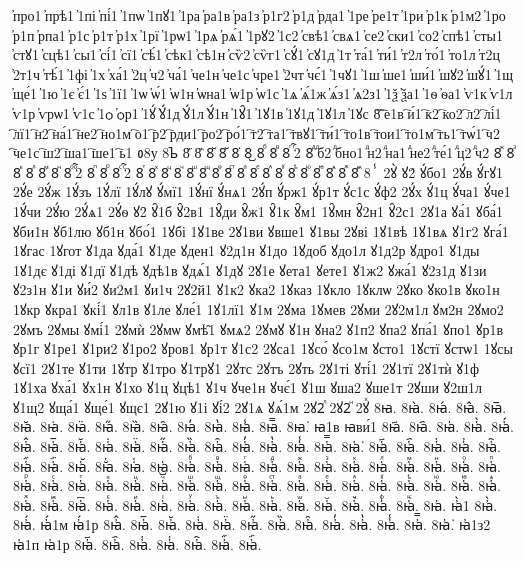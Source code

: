{҆про1
҆прѣ1
҆1пі
҆пі́1
҆1пѡ
҆1пꙋ1
҆1ра
҆ра1в
҆ра1з
҆р1г2
҆р1д
҆рда1
҆1ре
҆ре1т
҆1ри
҆р1к
҆р1м2
҆1ро
҆р1п
҆рпа1
҆р1с
҆р1т
҆р1х
҆1рї
҆1рѡ1
҆1рѧ
҆рѧ́1
҆1рꙋ2
҆1с2
҆свѣ1
҆свѧ1
҆се2
҆ски1
҆со2
҆спѣ1
҆сты1
҆стꙋ1
҆сцѣ1
҆сы1
҆сі́1
҆сї1
҆сѣ́1
҆сѣк1
҆сѣ1н
҆сѷ2
҆сѷг1
҆сꙋ́1
҆сꙋ1д
҆1т
҆та́1
҆ти́1
҆т2л
҆то́1
҆то1л
҆т2ц
҆2т1ч
҆тѣ́1
҆1фі
҆1х
҆ха́1
҆2ц
҆ч2
҆ча́1
҆че1н
҆че1с
҆чре1
҆2чт
҆чє́1
҆1чꙋ1
҆1ш
҆ше1
҆ши́1
҆шꙋ2
҆шꙋ́1
҆1щ
҆ще́1
҆1ю
҆1є
҆є́1
҆1ѕ
҆1ї1
҆1ѡ
҆ѡ́1
҆ѡ1н
҆ѡна1
҆ѡ1р
҆ѡ1с
҆1ѧ
҆ѧ́1ж
҆ѧ́з1
҆ѧ2з1
҆1ѯ
҆ѯа1
҆1ѳ
҆ѳа1
҆ѵ1к
҆ѵ1л
҆ѵ1р
҆ѵрѡ1
҆ѵ1с
҆1ѻ
҆ѻр1
҆1ꙋ́
҆ꙋ́1д
҆ꙋ́1л
҆ꙋ́1н
҆1ꙋ̑1
҆1ꙋ1в
҆1ꙋ1д
҆1ꙋ1л
҆1ꙋс
8҇
҇е1в
҇и́1
҇к2
҇ко2
҇л2
҇лі́1
҇лї1
҇н2
҇на́1
҇не2
҇но1м
҇о1
҇р2
҇рди1
҇ро2
҇ро́1
҇т2
҇та1
҇твꙋ1
҇ти́1
҇то1в
҇тои1
҇то1м
҇ть1
҇тѡ́1
҇ч2
҇че1с
҇ш2
҇ша1
҇ше1
҇ь1
ᲂ8у  
8ᲆ
8᷀
8᷁
8᷶
8᷷
8᷸
8᷹
8ⷠ
8ⷡ
8ⷢ
ⷢ҇2
8ⷣ
ⷣб2
ⷣбно1
ⷣн2
ⷣна1
ⷣне2
ⷣте́1
ⷣц2
ⷣч2
8ⷤ
8ⷥ
8ⷦ
8ⷧ
8ⷨ
8ⷩ
8ⷪ
ⷪ҇2
8ⷫ
8ⷬ
8ⷭ
ⷭ҇2
8ⷮ
8ⷯ
8ⷰ
8ⷱ
8ⷲ
8ⷳ
8ⷴ
8ⷵ
8ⷶ
8ⷷ
8ⷸ
8ⷹ
8ⷺ
8ⷻ
8ⷼ
8ⷽ
8ⷾ
8ⷿ
8ⸯ
2ꙋ̀
ꙋ2́
ꙋ́бо1
2ꙋ́в
ꙋ́гꙋ1
2ꙋ́е
2ꙋ́ж
1ꙋ́зъ
1ꙋ́лї
1ꙋ́лꙋ
ꙋ́мї1
1ꙋ́нї
ꙋ́нѧ1
2ꙋ́п
ꙋ́рж1
ꙋ́р1т
ꙋ́с1с
ꙋ́ф2
2ꙋ́х
ꙋ́1ц
ꙋ́ча1
ꙋ́че1
1ꙋ́чи
2ꙋ́ю
2ꙋ́ѧ1
2ꙋ́ѳ
ꙋ2̑
ꙋ̑1б
ꙋ̑2в1
1ꙋ̑ди
ꙋ̑ж1
ꙋ̑1к
ꙋ̑м1
1ꙋ̑мн
ꙋ̑2н1
ꙋ̑2с1
2ꙋ1а
ꙋа́1
ꙋба́1
ꙋби1н
ꙋб1лю
ꙋб1н
ꙋбо́1
1ꙋбі
1ꙋ1ве
2ꙋ1ви
ꙋвше1
ꙋ1вы
2ꙋві
1ꙋ1вѣ
1ꙋ1вѧ
ꙋ1г2
ꙋга́1
1ꙋгас
1ꙋгот
ꙋ1да
ꙋда́1
ꙋ1де
ꙋден1
ꙋ2д1н
ꙋ1до
1ꙋдоб
ꙋдо1л
ꙋ1д2р
ꙋдро1
ꙋ1ды
1ꙋ1дє
ꙋ1ді
ꙋ1дї
ꙋ1дѣ
ꙋдѣ1в
ꙋдѧ́1
ꙋ1дꙋ
2ꙋ1е
ꙋета1
ꙋете1
ꙋ1ж2
ꙋжа́1
ꙋ2з1д
ꙋ1зи
ꙋ2з1н
ꙋ1и
ꙋи́2
ꙋи2м1
ꙋи1ч
2ꙋ2й1
ꙋ1к2
ꙋка2
1ꙋказ
1ꙋкло
1ꙋклѡ
2ꙋко
ꙋко1в
ꙋко1н
1ꙋкр
ꙋкра1
ꙋкі́1
ꙋл1в
ꙋ1ле
ꙋле́1
1ꙋ1лї1
ꙋ1м
2ꙋма
1ꙋмев
2ꙋми
2ꙋ2м1л
ꙋм2н
2ꙋмо2
2ꙋмъ
2ꙋмы
ꙋмі́1
2ꙋмѝ
2ꙋмѡ
ꙋмѣ̑1
ꙋмѧ2
2ꙋмꙋ
ꙋ1н
ꙋна2
ꙋ1п2
ꙋпа2
ꙋпа́1
ꙋпо1
ꙋр1в
ꙋр1г
ꙋ1ре1
ꙋ1ри2
ꙋ1ро2
ꙋров1
ꙋр1т
ꙋ1с2
2ꙋса1
1ꙋсо́
ꙋсо1м
ꙋсто1
1ꙋстї
ꙋстѡ1
1ꙋсы
ꙋсї1
2ꙋ1те
ꙋ1ти
1ꙋтр
ꙋ1тро
ꙋ1трꙋ1
2ꙋтс
2ꙋтъ
2ꙋть
2ꙋ1ті
ꙋті́1
2ꙋ1тї
2ꙋ1тѝ
ꙋ1ф
1ꙋ1ха
ꙋха́1
ꙋх1н
ꙋ1хо
ꙋ1ц
ꙋцѣ1
ꙋ1ч
ꙋче1н
ꙋчє́1
ꙋ1ш
ꙋша2
ꙋше1т
2ꙋши
ꙋ2ш1л
ꙋ1щ2
ꙋща́1
ꙋще́1
ꙋщє1
2ꙋ1ю
ꙋ1і
ꙋі́2
2ꙋ1ѧ
ꙋѧ́1м
2ꙋ2ⷧ
2ꙋ2ⷩ
2ꙋⷯ
8ꙗ.
8ꙗ̀.
8ꙗ́.
8ꙗ̂.
8ꙗ̅.
8ꙗ̆.
8ꙗ̇.
8ꙗ̈.
8ꙗ̋.
8ꙗ̏.
8ꙗ̑.
8ꙗ̓.
8ꙗ̔.
8ꙗ̾.
8ꙗ̿.
8ꙗ͘.
ꙗ1в
ꙗви́1
8ꙗ҃.
8ꙗ҄.
8ꙗ҅.
8ꙗ҅̀.
8ꙗ҅́.
8ꙗ҅̂.
8ꙗ҅̅.
8ꙗ҅̆.
8ꙗ҅̇.
8ꙗ҅̈.
8ꙗ҅̋.
8ꙗ҅̏.
8ꙗ҅̑.
8ꙗ҅̓.
8ꙗ҅̔.
8ꙗ҅̾.
8ꙗ҅̿.
8ꙗ҅͘.
8ꙗ҅҃.
8ꙗ҅҄.
8ꙗ҅҅.
8ꙗ҅҆.
8ꙗ҅҇.
8ꙗ҅᷀.
8ꙗ҅᷁.
8ꙗ҅᷶.
8ꙗ᷷҅.
8ꙗ᷸҅.
8ꙗ᷹҅.
8ꙗ҅ⷠ.
8ꙗ҅ⷡ.
8ꙗ҅ⷢ.
8ꙗ҅ⷣ.
8ꙗ҅ⷤ.
8ꙗ҅ⷥ.
8ꙗ҅ⷦ.
8ꙗ҅ⷧ.
8ꙗ҅ⷨ.
8ꙗ҅ⷩ.
8ꙗ҅ⷪ.
8ꙗ҅ⷫ.
8ꙗ҅ⷬ.
8ꙗ҅ⷭ.
8ꙗ҅ⷮ.
8ꙗ҅ⷯ.
8ꙗ҅ⷰ.
8ꙗ҅ⷱ.
8ꙗ҅ⷲ.
8ꙗ҅ⷳ.
8ꙗ҅ⷴ.
8ꙗ҅ⷵ.
8ꙗ҅ⷶ.
8ꙗ҅ⷷ.
8ꙗ҅ⷸ.
8ꙗ҅ⷹ.
8ꙗ҅ⷺ.
8ꙗ҅ⷻ.
8ꙗ҅ⷼ.
8ꙗ҅ⷽ.
8ꙗ҅ⷾ.
8ꙗ҅ⷿ.
8ꙗ҅꙯.
8ꙗ҅ꙴ.
8ꙗ҅ꙵ.
8ꙗ҅ꙶ.
8ꙗ҅ꙷ.
8ꙗ҅ꙸ.
8ꙗ҅ꙹ.
8ꙗ҅ꙺ.
8ꙗ҅ꙻ.
8ꙗ҅꙼.
8ꙗ҅꙽.
8ꙗ҅ꚞ.
8ꙗ҅ꚟ.
8ꙗ҆.
ꙗ҆̀1
8ꙗ҆̀.
8ꙗ҆́.
ꙗ҆́1м
ꙗ҆́1р
8ꙗ҆̂.
8ꙗ҆̅.
8ꙗ҆̆.
8ꙗ҆̇.
8ꙗ҆̈.
8ꙗ҆̋.
8ꙗ҆̏.
8ꙗ҆̑.
8ꙗ҆̓.
8ꙗ҆̔.
8ꙗ҆̾.
8ꙗ҆̿.
8ꙗ҆͘.
ꙗ҆1з2
ꙗ҆1п
ꙗ҆1р
8ꙗ҆҃.
8ꙗ҆҄.
8ꙗ҆҅.
8ꙗ҆҆.
8ꙗ҆҇.
8ꙗ҆᷀.
8ꙗ҆᷁.
}
